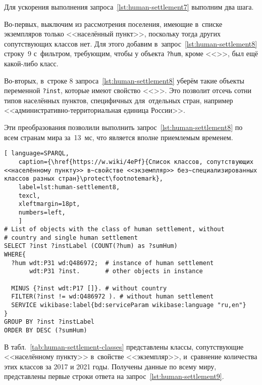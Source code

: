 Для ускорения выполнения запроса~\ref{lst:human-settlement7} выполним два шага.
 
Во-первых, выключим из рассмотрения поселения, 
имеющие в~списке экземпляров только <<населённый пункт>>, 
поскольку тогда других сопутствующих классов нет. 
Для этого добавим в~запрос~\ref{lst:human-settlement8} строку~\num{9} с~фильтром, 
требующим, чтобы у объекта \lstinline|?hum|, 
кроме  <<>>, был ещё какой-либо класс.

Во-вторых, в~строке \num{8} запроса~\ref{lst:human-settlement8} 
уберём такие объекты переменной \lstinline|?inst|, 
которые имеют свойство <<>>. 
Это позволит отсечь сотни типов населённых пунктов, специфичных для~отдельных стран, 
например <<административно-территориальная единица России>>.

Эти преобразования позволили выполнить запрос~\ref{lst:human-settlement8} 
по всем странам мира за~13~мс, что является вполне приемлемым временем.


\newpage
\lstset{numbers=left, firstnumber=1, frame=single}
\begin{lstlisting}[ language=SPARQL, 
    caption={\href{https://w.wiki/4ePf}{Cписок классов, сопутствующих <<населённому пункту>> в~свойстве <<экземпляр>> без~специализированных классов разных стран}\protect\footnotemark},
    label=lst:human-settlement8,
    texcl,
    xleftmargin=18pt, 
    numbers=left,
    ]
# List of objects with the class of human settlement, without 
# country and single human settlement
SELECT ?inst ?instLabel (COUNT(?hum) as ?sumHum) 
WHERE{ 
  ?hum wdt:P31 wd:Q486972;  # instance of human settlement
       wdt:P31 ?inst.       # other objects in instance
  
  MINUS {?inst wdt:P17 []}. # without country
  FILTER(?inst != wd:Q486972 ). # without human settlement
  SERVICE wikibase:label{bd:serviceParam wikibase:language "ru,en"}
}  
GROUP BY ?inst ?instLabel
ORDER BY DESC (?sumHum)
\end{lstlisting}%

В табл.~\ref{tab:human-settlement-classes} представлены классы, 
сопутствующие <<населённому пункту>> в~свойстве <<экземпляр>>, 
и~сравнение количества этих классов за 2017 и 2021 годы. 
Получены данные по всему миру, представлены первые строки ответа на запрос~\ref{lst:human-settlement9}.

